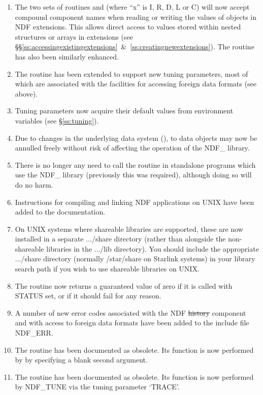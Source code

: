 \begin{enumerate}
\item The two sets of routines  and  (where ``x''
is I, R, D, L or C) will now accept compound component names when
reading or writing the values of objects in NDF extensions. This
allows direct access to values stored within nested structures or
arrays in extensions (see
\S\S\ref{ss:accessingexistingextensions}~\&~\ref{ss:creatingnewextensions}).
The routine  has also been similarly enhanced.

\item The routine  has been extended to support new tuning
parameters, most of which are associated with the facilities for
accessing foreign data formats (see above).

\item Tuning parameters now acquire their default values from
environment variables (see \S\ref{ss:tuning}).

\item Due to changes in the underlying data system
(),  to
data objects may now be annulled freely without risk of affecting the
operation of the NDF\_ library.

\item There is no longer any need to call the routine 
in standalone programs which use the NDF\_ library (previously this
was required), although doing so will do no harm.

\item Instructions for compiling and linking NDF applications on
UNIX have been added to the documentation.

\item On UNIX systems where shareable libraries are supported, these
are now installed in a separate .../share directory (rather than
alongside the non-shareable libraries in the .../lib directory). You
should include the appropriate .../share directory (normally
/star/share on Starlink systems) in your library search path if you
wish to use shareable libraries on UNIX.

\item The routine  now returns a guaranteed value of zero if
it is called with STATUS set, or if it should fail for any reason.

\item A number of new error codes associated with the NDF \st{history\/}
component and with access to foreign data formats have been added to
the include file NDF\_ERR.

\item The routine  has been documented as obsolete. Its
function is now performed by  by specifying a blank second
argument.

\item The routine  has been documented as obsolete. Its
function is now performed by NDF\_TUNE via the tuning parameter
`TRACE'.

\end{enumerate}


